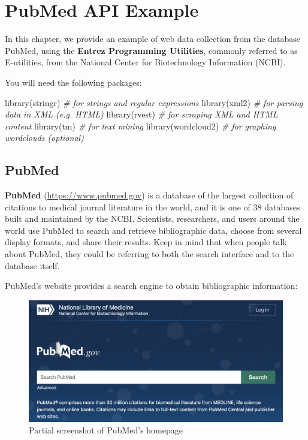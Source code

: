\documentclass[
]{book}
\newenvironment{Shaded}{\begin{snugshade}}{\end{snugshade}}
\newcommand{\CommentTok}[1]{\textcolor[rgb]{0.56,0.35,0.01}{\textit{#1}}}
\newcommand{\FunctionTok}[1]{\textcolor[rgb]{0.00,0.00,0.00}{#1}}
\newcommand{\NormalTok}[1]{#1}
\begin{document}
\hypertarget{api-pubmed}{%
\chapter{PubMed API Example}\label{api-pubmed}}

In this chapter, we provide an example of web data collection from the database
PubMed, using the \textbf{Entrez Programming Utilities}, commonly referred to as
E-utilities, from the National Center for Biotechnology Information (NCBI).

You will need the following packages:

\begin{Shaded}
\begin{Highlighting}[]
\FunctionTok{library}\NormalTok{(stringr)    }\CommentTok{\# for strings and regular expressions}
\FunctionTok{library}\NormalTok{(xml2)       }\CommentTok{\# for parsing data in XML (e.g. HTML)}
\FunctionTok{library}\NormalTok{(rvest)      }\CommentTok{\# for scraping XML and HTML content}
\FunctionTok{library}\NormalTok{(tm)         }\CommentTok{\# for text mining}
\FunctionTok{library}\NormalTok{(wordcloud2) }\CommentTok{\# for graphing wordclouds (optional)}
\end{Highlighting}
\end{Shaded}

\hypertarget{pubmed}{%
\section{PubMed}\label{pubmed}}

\textbf{PubMed} (\url{https://www.pubmed.gov}) is a database of the largest collection of
citations to medical journal literature in the world, and it is one of 38
databases built and maintained by the NCBI. Scientists, researchers, and users
around the world use PubMed to search and retrieve bibliographic data, choose
from several display formats, and share their results. Keep in mind that when
people talk about PubMed, they could be referring to both the search interface
and to the database itself.

PubMed's website provides a search engine to obtain bibliographic information:

\begin{figure}

{\centering \includegraphics[width=0.7\linewidth]{images/api/pubmed-homepage} 

}

\caption{Partial screenshot of PubMed's homepage}\label{fig:unnamed-chunk-130}
\end{figure}
\end{document}
